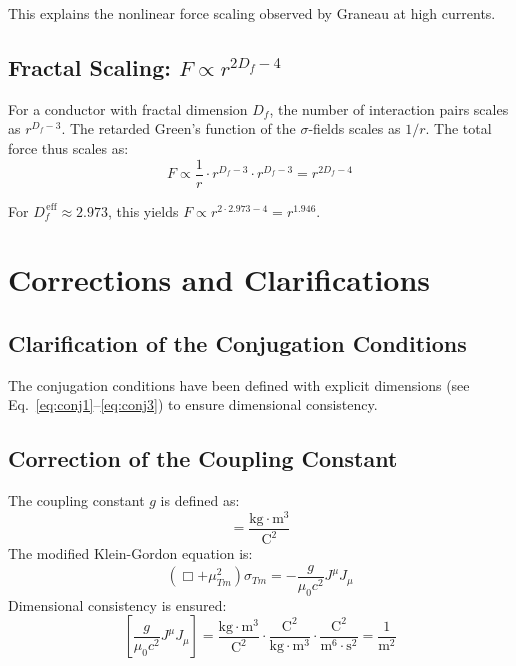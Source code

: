 	This explains the nonlinear force scaling observed by Graneau at high currents.
	
	\subsection{Fractal Scaling: $F \propto r^{2D_f - 4}$}
	For a conductor with fractal dimension $D_f$, the number of interaction pairs scales as $r^{D_f - 3}$. The retarded Green’s function of the $\sigma$-fields scales as $1/r$. The total force thus scales as:
	\begin{equation}
		F \propto \frac{1}{r} \cdot r^{D_f - 3} \cdot r^{D_f - 3} = r^{2D_f - 4} \label{eq:fractal_scaling}
	\end{equation}
	
	For $D_f^{\,\text{eff}} \approx 2.973$, this yields $F \propto r^{2 \cdot 2.973 - 4} = r^{1.946}$.
	
	\section{Corrections and Clarifications}
	\subsection{Clarification of the Conjugation Conditions}
	The conjugation conditions have been defined with explicit dimensions (see Eq.~\ref{eq:conj1}–\ref{eq:conj3}) to ensure dimensional consistency.
	
	\subsection{Correction of the Coupling Constant}
	The coupling constant $g$ is defined as:
	\begin{equation}
		[g] = \frac{\text{kg} \cdot \text{m}^3}{\text{C}^2}
	\end{equation}
	The modified Klein-Gordon equation is:
	\begin{equation}
		(\Box + \mu_{Tm}^2) \sigma_{Tm} = -\frac{g}{\mu_0 c^2} J^\mu J_\mu \label{eq:sigma_eq_final}
	\end{equation}
	Dimensional consistency is ensured:
	\begin{equation}
		\left[\frac{g}{\mu_0 c^2} J^\mu J_\mu\right] = \frac{\text{kg} \cdot \text{m}^3}{\text{C}^2} \cdot \frac{\text{C}^2}{\text{kg} \cdot \text{m}^3} \cdot \frac{\text{C}^2}{\text{m}^6 \cdot \text{s}^2} = \frac{1}{\text{m}^2}
	\end{equation}
	
